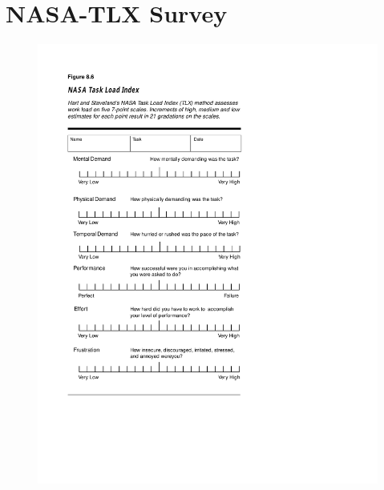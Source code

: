 \chapter{NASA-TLX Survey}\label{appendix:tlx}

\begin{figure}[htop]
 \centering 
 \includegraphics[page=1, width=\textwidth]{images/tlx.pdf}
\end{figure}